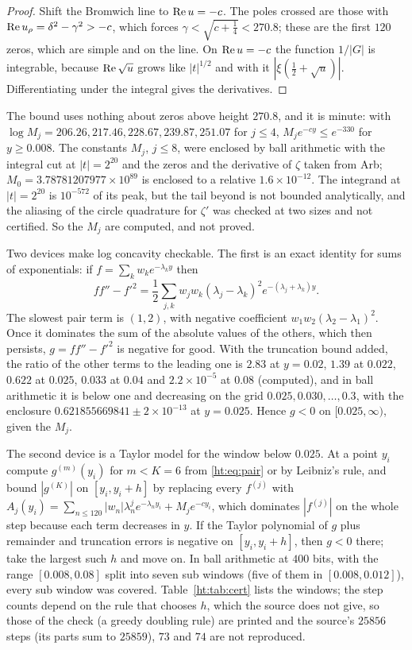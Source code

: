 \begin{proof}
Shift the Bromwich line to $\operatorname{Re} u=-c$. The poles crossed are those with $\operatorname{Re} u_\rho=\delta^2-\gamma^2>-c$, which forces $\gamma<\sqrt{c+\frac14}<270.8$; these are the first $120$ zeros, which are simple and on the line. On $\operatorname{Re} u=-c$ the function $1/|G|$ is integrable, because $\operatorname{Re}\sqrt u$ grows like $|t|^{1/2}$ and with it $|\xi(\frac12+\sqrt u)|$. Differentiating under the integral gives the derivatives.
\end{proof}

The bound uses nothing about zeros above height $270.8$, and it is minute: with $\log M_j=206.26,217.46,228.67,239.87,251.07$ for $j\le4$, $M_je^{-cy}\le e^{-330}$ for $y\ge0.008$. The constants $M_j$, $j\le8$, were enclosed by ball arithmetic with the integral cut at $|t|=2^{20}$ and the zeros and the derivative of $\zeta$ taken from Arb; $M_0=3.78781207977\times10^{89}$ is enclosed to a relative $1.6\times10^{-12}$. The integrand at $|t|=2^{20}$ is $10^{-572}$ of its peak, but the tail beyond is not bounded analytically, and the aliasing of the circle quadrature for $\zeta'$ was checked at two sizes and not certified. So the $M_j$ are computed, and not proved.

Two devices make log concavity checkable. The first is an exact identity for sums of exponentials: if $f=\sum_kw_ke^{-\lambda_ky}$ then
\begin{equation}\label{ht:eq:pair}
ff''-f'^2=\frac12\sum_{j,k}w_jw_k(\lambda_j-\lambda_k)^2e^{-(\lambda_j+\lambda_k)y}.
\end{equation}
The slowest pair term is $(1,2)$, with negative coefficient $w_1w_2(\lambda_2-\lambda_1)^2$. Once it dominates the sum of the absolute values of the others, which then persists, $g=ff''-f'^2$ is negative for good. With the truncation bound added, the ratio of the other terms to the leading one is $2.83$ at $y=0.02$, $1.39$ at $0.022$, $0.622$ at $0.025$, $0.033$ at $0.04$ and $2.2\times10^{-5}$ at $0.08$ (computed), and in ball arithmetic it is below one and decreasing on the grid $0.025,0.030,\dots,0.3$, with the enclosure $0.621855669841\pm2\times10^{-13}$ at $y=0.025$. Hence $g<0$ on $[0.025,\infty)$, given the $M_j$.

The second device is a Taylor model for the window below $0.025$. At a point $y_i$ compute $g^{(m)}(y_i)$ for $m<K=6$ from \eqref{ht:eq:pair} or by Leibniz's rule, and bound $|g^{(K)}|$ on $[y_i,y_i+h]$ by replacing every $f^{(j)}$ with $A_j(y_i)=\sum_{n\le120}|w_n|\lambda_n^je^{-\lambda_ny_i}+M_je^{-cy_i}$, which dominates $|f^{(j)}|$ on the whole step because each term decreases in $y$. If the Taylor polynomial of $g$ plus remainder and truncation errors is negative on $[y_i,y_i+h]$, then $g<0$ there; take the largest such $h$ and move on. In ball arithmetic at $400$ bits, with the range $[0.008,0.08]$ split into seven sub windows (five of them in $[0.008,0.012]$), every sub window was covered. Table~\ref{ht:tab:cert} lists the windows; the step counts depend on the rule that chooses $h$, which the source does not give, so those of the check (a greedy doubling rule) are printed and the source's $25856$ steps (its parts sum to $25859$), $73$ and $74$ are not reproduced.

